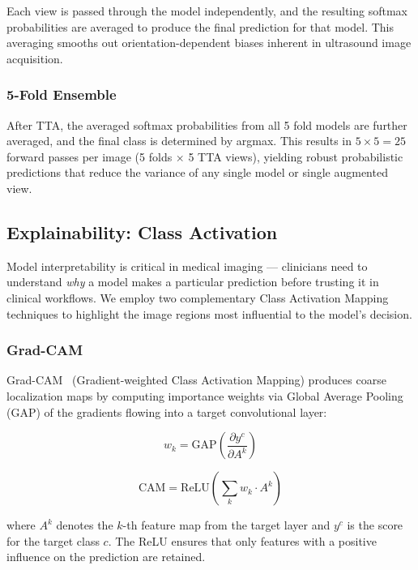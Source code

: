 \documentclass[conference]{IEEEtran}
\begin{document}
Each view is passed through the model independently, and the resulting softmax probabilities
are averaged to produce the final prediction for that model. This averaging smooths out
orientation-dependent biases inherent in ultrasound image acquisition.

\subsubsection{5-Fold Ensemble}

\medskip
After TTA, the averaged softmax probabilities from all 5 fold models are further averaged, and
the final class is determined by argmax. This results in $5 \times 5 = 25$ forward passes per
image (5 folds $\times$ 5 TTA views), yielding robust probabilistic predictions that reduce
the variance of any single model or single augmented view.

\subsection{Explainability: Class Activation}

\medskip
Model interpretability is critical in medical imaging --- clinicians need to understand
\textit{why} a model makes a particular prediction before trusting it in clinical workflows. We
employ two complementary Class Activation Mapping techniques to highlight the image regions
most influential to the model's decision.

\subsubsection{Grad-CAM}

\medskip
Grad-CAM~\cite{Selvaraju2017GradCAM} (Gradient-weighted Class Activation Mapping) produces
coarse localization maps by computing importance weights via Global Average Pooling (GAP) of
the gradients flowing into a target convolutional layer:

\begin{equation}
  w_k = \mathrm{GAP}\!\left(\frac{\partial y^c}{\partial A^k}\right)
\end{equation}

\begin{equation}
  \mathrm{CAM} = \mathrm{ReLU}\!\left(\sum_k w_k \cdot A^k\right)
\end{equation}

where $A^k$ denotes the $k$-th feature map from the target layer and $y^c$ is the score for
the target class $c$. The ReLU ensures that only features with a positive influence on the
prediction are retained.
\end{document}
